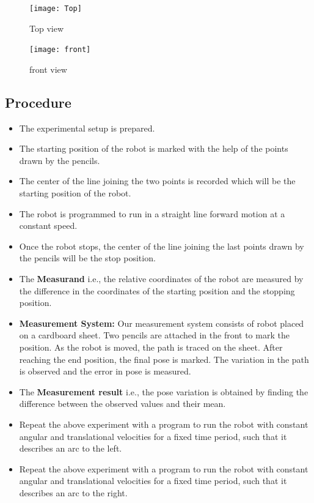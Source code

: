 \documentclass[11pt,a4paper]{article}
\begin{document}
	\begin{figure}[H]
		\centering
		\centering
		\texttt{[image: Top]}
		\caption{Top view}
		\label{fig:top}
	\end{figure}
	
	\begin{figure}[H]
		\centering
		\centering
		\texttt{[image: front]}
		\caption{front view}
		\label{fig:front}
	\end{figure}
	
	\newpage
	\subsection{\textbf{Procedure}}
	\begin{itemize}
		\item The experimental setup is prepared.
		\item The starting position of the robot is marked with the help of the points drawn by the pencils.
		\item The center of the line joining the two points is recorded which will be the starting position of the robot.
		\item The robot is programmed to run in a straight line forward motion at a constant speed.
		\item Once the robot stops, the center of the line joining the last points drawn by the pencils will be the stop position.
		\item The \textbf{Measurand} i.e., the relative coordinates of the robot are measured by the difference in the coordinates of the starting position and the stopping position.
		\item \textbf{Measurement System:} Our measurement system consists of robot placed on a cardboard sheet. Two pencils are attached in the front to mark the position. As the robot is moved, the path is traced on the sheet. After reaching the end position, the final pose is marked. The variation in the path is observed and the error in pose is measured.
		\item The \textbf{Measurement result} i.e., the pose variation is obtained by finding the difference between the observed values and their mean.
		\item Repeat the above experiment with a program to run the robot with constant angular and translational velocities for a fixed time period, such that it describes an arc to the left.
		\item Repeat the above experiment with a program to run the robot with constant angular and translational velocities for a fixed time period, such that it describes an arc to the right.
	\end{itemize}
	
\end{document}
